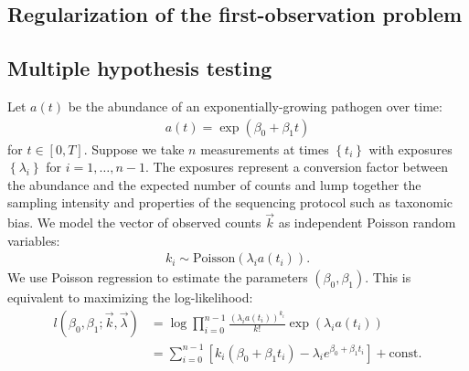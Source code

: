 \documentclass[12pt, letterpaper]{article}
\begin{document}
\subsection{Regularization of the first-observation problem}

\subsection{Multiple hypothesis testing}

Let $a(t)$ be the abundance of an exponentially-growing pathogen over time:
\begin{align}
    a(t) = \exp(\beta_0 + \beta_1 t)
\end{align}
for $t \in \left[ 0, T\right]$.
Suppose we take $n$ measurements at times $\left\{t_i\right\}$ with exposures $\left\{\lambda_i\right\}$ for $i = 1, \ldots, n-1$.
The exposures represent a conversion factor between the abundance and the expected number of counts and lump together the sampling intensity and properties of the sequencing protocol such as taxonomic bias.
We model the vector of observed counts $\vec{k}$ as independent Poisson random variables:
\begin{align}
    k_i \sim \text{Poisson}(\lambda_i a(t_i)).
\end{align}
We use Poisson regression to estimate the parameters $(\beta_0, \beta_1)$.
This is equivalent to maximizing the log-likelihood:
\begin{align}
    l(\beta_0, \beta_1; \vec{k}, \vec{\lambda})
    & = \log \prod_{i=0}^{n-1} \frac{{(\lambda_i a(t_i))}^{k_i}}{k!} \exp(\lambda_i a(t_i))\\
    & = \sum_{i=0}^{n-1} \left[k_i(\beta_0 + \beta_1 t_i) - \lambda_i e^{\beta_0 + \beta_1 t_i} \right] + \text{const.}
\end{align}
\end{document}
